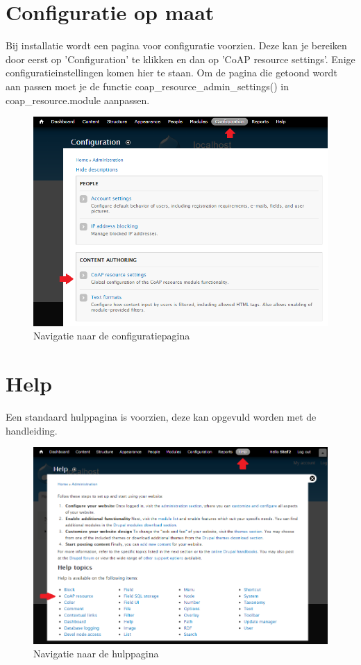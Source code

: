 \section{Configuratie op maat} \label{configuratie}
Bij installatie wordt een pagina voor configuratie voorzien. Deze kan je bereiken door eerst op 'Configuration' te klikken en dan op 'CoAP resource settings'. Enige configuratieinstellingen komen hier te staan. Om de pagina die getoond wordt aan passen moet je de functie coap\_resource\_admin\_settings() in coap\_resource.module aanpassen.
\begin{figure}[h!]
\vspace{10pt}
\includegraphics[width=1\textwidth]{fig/Configuratie}
\vspace{-30pt}
\caption{Navigatie naar de configuratiepagina}
\vspace{-10pt}
\end{figure}

\section{Help}
Een standaard hulppagina is voorzien, deze kan opgevuld worden met de handleiding.
\begin{figure}[h!]
\vspace{10pt}
\includegraphics[width=1\textwidth]{fig/Help}
\vspace{-30pt}
\caption{Navigatie naar de hulppagina}
\vspace{-10pt}
\end{figure}

